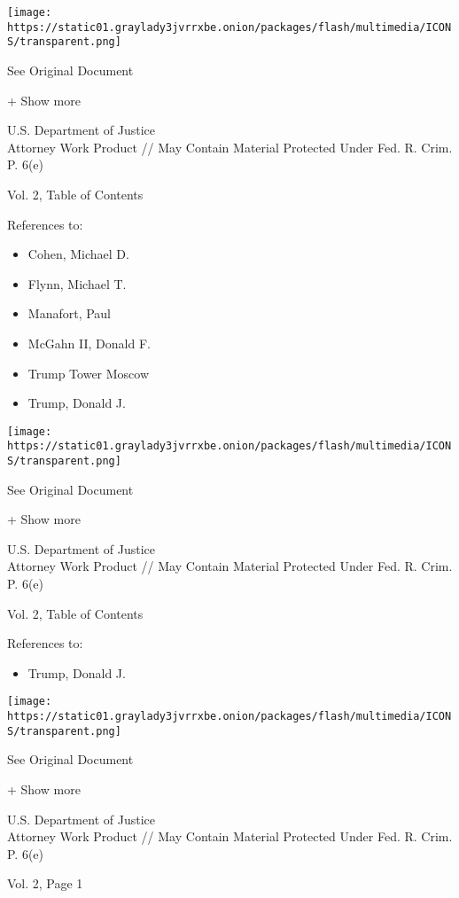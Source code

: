 \protect\hyperlink{}{}

\texttt{[image: https://static01.graylady3jvrrxbe.onion/packages/flash/multimedia/ICONS/transparent.png]}

See Original Document

+ Show more

U.S. Department of Justice\\
Attorney Work Product // May Contain Material Protected Under Fed. R.
Crim. P. 6(e)

Vol. 2, Table of Contents

References to:

\begin{itemize}
\tightlist
\item
  Cohen, Michael D.
\item
  Flynn, Michael T.
\item
  Manafort, Paul 
\item
  McGahn II, Donald F.
\item
  Trump Tower Moscow
\item
  Trump, Donald J.
\end{itemize}

\protect\hyperlink{}{}

\texttt{[image: https://static01.graylady3jvrrxbe.onion/packages/flash/multimedia/ICONS/transparent.png]}

See Original Document

+ Show more

U.S. Department of Justice\\
Attorney Work Product // May Contain Material Protected Under Fed. R.
Crim. P. 6(e)

Vol. 2, Table of Contents

References to:

\begin{itemize}
\tightlist
\item
  Trump, Donald J.
\end{itemize}

\protect\hyperlink{}{}

\texttt{[image: https://static01.graylady3jvrrxbe.onion/packages/flash/multimedia/ICONS/transparent.png]}

See Original Document

+ Show more

U.S. Department of Justice\\
Attorney Work Product // May Contain Material Protected Under Fed. R.
Crim. P. 6(e)

Vol. 2, Page 1

